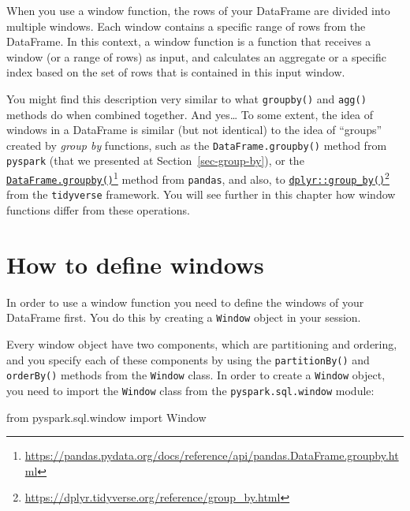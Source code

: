 \documentclass[
  11pt,
  letterpaper,
  DIV=11,
  numbers=noendperiod]{scrreprt}
\newenvironment{Shaded}{\begin{snugshade}}{\end{snugshade}}
\newcommand{\ImportTok}[1]{\textcolor[rgb]{0.00,0.46,0.62}{#1}}
\newcommand{\NormalTok}[1]{\textcolor[rgb]{0.00,0.23,0.31}{#1}}
\begin{document}
When you use a window function, the rows of your DataFrame are divided
into multiple windows. Each window contains a specific range of rows
from the DataFrame. In this context, a window function is a function
that receives a window (or a range of rows) as input, and calculates an
aggregate or a specific index based on the set of rows that is contained
in this input window.

You might find this description very similar to what \texttt{groupby()}
and \texttt{agg()} methods do when combined together. And yes\ldots{} To
some extent, the idea of windows in a DataFrame is similar (but not
identical) to the idea of ``groups'' created by \emph{group by}
functions, such as the \texttt{DataFrame.groupby()} method from
\texttt{pyspark} (that we presented at Section~\ref{sec-group-by}), or
the
\href{https://pandas.pydata.org/docs/reference/api/pandas.DataFrame.groupby.html}{\texttt{DataFrame.groupby()}}\footnote{\url{https://pandas.pydata.org/docs/reference/api/pandas.DataFrame.groupby.html}}
method from \texttt{pandas}, and also, to
\href{https://dplyr.tidyverse.org/reference/group_by.html}{\texttt{dplyr::group\_by()}}\footnote{\url{https://dplyr.tidyverse.org/reference/group_by.html}}
from the \texttt{tidyverse} framework. You will see further in this
chapter how window functions differ from these operations.

\hypertarget{sec-window-def}{%
\section{How to define windows}\label{sec-window-def}}

In order to use a window function you need to define the windows of your
DataFrame first. You do this by creating a \texttt{Window} object in
your session.

Every window object have two components, which are partitioning and
ordering, and you specify each of these components by using the
\texttt{partitionBy()} and \texttt{orderBy()} methods from the
\texttt{Window} class. In order to create a \texttt{Window} object, you
need to import the \texttt{Window} class from the
\texttt{pyspark.sql.window} module:

\begin{Shaded}
\begin{Highlighting}[]
\ImportTok{from}\NormalTok{ pyspark.sql.window }\ImportTok{import}\NormalTok{ Window}
\end{Highlighting}
\end{Shaded}
\end{document}
